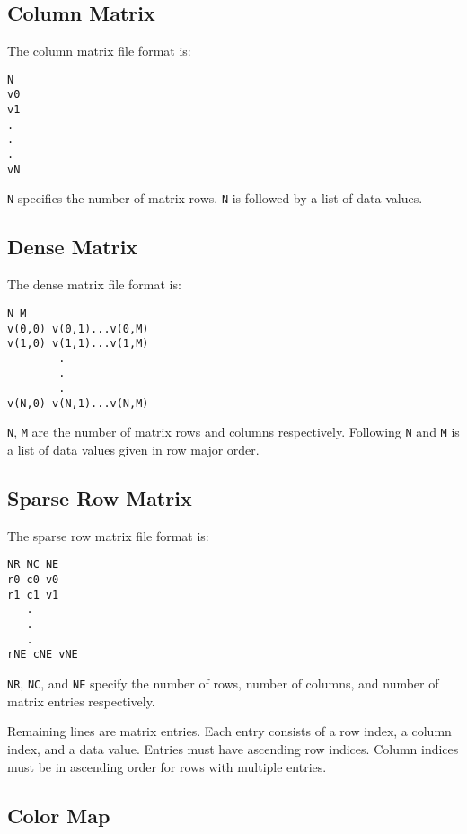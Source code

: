 \subsection{Column Matrix}
\label{sec:colmat}

The column matrix file format is:

\begin{verbatim}
N
v0 
v1
.
.
.
vN
\end{verbatim}

\verb|N| specifies the number of matrix rows.  \verb|N| is followed by
a list of data values.

\subsection{Dense Matrix}
\label{sec:dense_matrix}

The dense matrix file format is:

\begin{verbatim}
N M
v(0,0) v(0,1)...v(0,M)
v(1,0) v(1,1)...v(1,M)
        .
        .
        .
v(N,0) v(N,1)...v(N,M)
\end{verbatim}

\verb|N|, \verb|M| are the number of matrix rows and columns
respectively.  Following \verb|N| and \verb|M| is a list of data
values given in row major order.


\subsection{Sparse Row Matrix}
\label{sparse_row_matrix}

The sparse row matrix file format is:

\begin{verbatim}
NR NC NE
r0 c0 v0
r1 c1 v1
   .
   .
   .
rNE cNE vNE
\end{verbatim}

\verb|NR|, \verb|NC|, and \verb|NE| specify the number of rows, number
of columns, and number of matrix entries respectively.  

Remaining lines are matrix entries.  Each entry consists of a row
index, a column index, and a data value.  Entries must have ascending
row indices. Column indices must be in ascending order for rows with
multiple entries.

\subsection{Color Map}
\label{sec:colormap_fmt}

